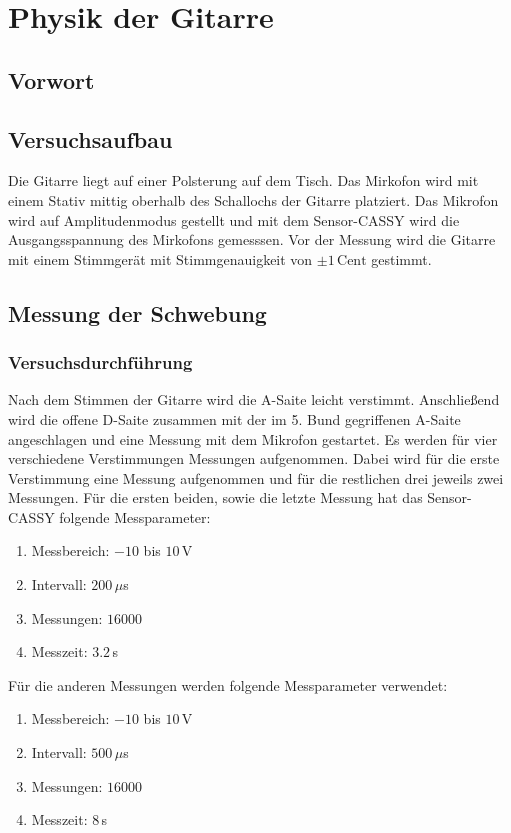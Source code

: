 \section{Physik der Gitarre}

\subsection{Vorwort}


\subsection{Versuchsaufbau}

Die Gitarre liegt auf einer Polsterung auf dem Tisch. Das Mirkofon wird mit einem Stativ mittig oberhalb des Schallochs der Gitarre platziert. Das Mikrofon wird auf Amplitudenmodus gestellt und mit dem Sensor-CASSY wird die Ausgangsspannung des Mirkofons gemesssen. Vor der Messung wird die Gitarre mit einem Stimmgerät mit Stimmgenauigkeit von $\pm 1 \, \mathrm{Cent}$ gestimmt.


\subsection{Messung der Schwebung}


\subsubsection{Versuchsdurchführung}

Nach dem Stimmen der Gitarre wird die A-Saite leicht verstimmt. Anschließend wird die offene D-Saite zusammen mit der im 5. Bund gegriffenen A-Saite angeschlagen und eine Messung mit dem Mikrofon gestartet. Es werden für vier verschiedene Verstimmungen Messungen aufgenommen. Dabei wird für die erste Verstimmung eine Messung aufgenommen und für die restlichen drei jeweils zwei Messungen. Für die ersten beiden, sowie die letzte Messung hat das Sensor-CASSY folgende Messparameter:
\begin{enumerate}[-]
\item Messbereich: $-10$ bis $10\,$V
\item Intervall: $200\,\mu$s
\item Messungen: $16000$
\item Messzeit: $3.2\,$s
\end{enumerate}
Für die anderen Messungen werden folgende Messparameter verwendet:
\begin{enumerate}[-]
\item Messbereich: $-10$ bis $10\,$V
\item Intervall: $500\,\mu$s
\item Messungen: $16000$
\item Messzeit: $8\,$s
\end{enumerate}


